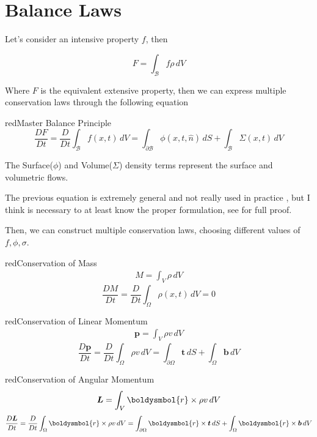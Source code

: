 \documentclass[a4paper, 11pt,article,oneside]{memoir}%
\begin{document}
\section{Balance Laws}
Let's consider an intensive property $f$, then
\begin{eqbox}
\begin{equation*}
F=\int_\mathcal{B} f\rho \,dV
\end{equation*}
\end{eqbox}
Where $F$ is the equivalent extensive property, then we can express multiple conservation laws through the following equation 
\begin{eqbox2}{red}{Master Balance Principle}
\begin{equation*}
\frac{DF}{Dt}=\frac{D}{Dt}\int_\mathcal{B} f(x,t)\, dV=\int_{\partial \mathcal{B}}\phi(x,t,\hat{n})\,dS +\int_\mathcal{B} \Sigma(x,t) \,dV
\end{equation*}
\end{eqbox2}
The Surface($\phi$) and Volume($\Sigma$) density terms represent the surface and volumetric flows. 
\begin{note}
The previous equation is extremely general and not really used in practice , but I think is necessary to at least know the proper formulation, see \cite{ICE2114} for full proof.
\end{note}
Then, we can construct multiple conservation laws, choosing different values of $f,\phi,\sigma$.
\begin{eqbox2}{red}{Conservation of Mass}
\begin{align*}
M=\int_V \rho \,dV
\end{align*}
\begin{equation*}
\frac{DM}{Dt}=\frac{D}{Dt}\int_\Omega \rho(x,t) \,dV=0
\end{equation*}
\end{eqbox2}
\begin{eqbox2}{red}{Conservation of Linear Momentum}
\begin{align*}
\boldsymbol{p}=\int_V \rho v \,dV
\end{align*}
\begin{equation*}
\frac{D\boldsymbol{p}}{Dt}=\frac{D}{Dt}\int_\Omega \rho v\, dV=\int_{\partial \Omega}\boldsymbol{t}\,dS +\int_\Omega \boldsymbol{b} \,dV
\end{equation*}
\end{eqbox2}
\begin{eqbox2}{red}{Conservation of Angular Momentum}
\begin{align*}
\boldsymbol{L}=\int_V  \boldysmbol{r}\times \rho v \,dV
\end{align*}
\begin{equation*}
\frac{D\boldsymbol{L}}{Dt}=\frac{D}{Dt}\int_\Omega \boldysmbol{r}\times\rho v\, dV=\int_{\partial \Omega}\boldysmbol{r}\times\boldsymbol{t}\,dS +\int_\Omega \boldysmbol{r}\times\boldsymbol{b} \,dV
\end{equation*}
\end{eqbox2}
\end{document}

